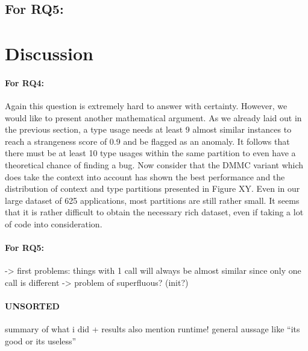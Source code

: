 \subsection{For RQ5:}


\section{Discussion}

\paragraph{For RQ4:}

Again this question is extremely hard to answer with certainty.
However, we would like to present another mathematical argument. 
As we already laid out in the previous section, a type usage needs at least 9 almost similar instances to reach a strangeness score of 0.9 and be flagged as an anomaly.
It follows that there must be at least 10 type usages within the same partition to even have a theoretical chance of finding a bug.
Now consider that the $\text{DMMC}$ variant which does take the context into account has shown the best performance and the distribution of context and type partitions presented in Figure XY.
Even in our large dataset of 625 applications, most partitions are still rather small. 
It seems that it is rather difficult to obtain the necessary rich dataset, even if taking a lot of code into consideration.

\paragraph{For RQ5:}
    -> first problems: things with 1 call will always be almost similar since only one call is different
    -> problem of superfluous? (init?)

\paragraph{UNSORTED}
summary of what i did + results
also mention runtime!
general aussage like ``its good or its useless''

